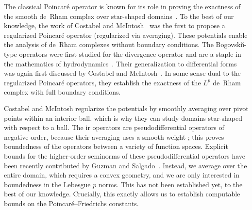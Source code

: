 \documentclass[10pt,letterpaper]{article}
\newcommand\cye[1]{%
  \protect\leavevmode
  \begingroup
    \color{red!35!yellow}%
    #1%
  \endgroup
}
\begin{document}


\begin{remark} \label{remark:reg_Poinc_Bog}
    The classical Poincar\'e operator is known for its role in proving the exactness of the smooth de~Rham complex over star-shaped domains~\cite{lee2012smooth}.
    To the best of our knowledge, the work of Costabel and McIntosh~\cite{costabel2010bogovskiui} was the first to propose a regularized Poincar\'e operator (regularized via averaging).
    These potentials enable the analysis of de~Rham complexes without boundary conditions.
    The Bogovski\u{\i}-type operators were first studied for the divergence operator and are a staple in the mathematics of hydrodynamics~\cite{bogovskii1979solution}.
    Their generalization to differential forms was \cye{again} first discussed by Costabel and McIntosh~\cite{costabel2010bogovskiui}. 
    In some sense dual to the regularized Poincar\'e operators, they establish the exactness of the $L^{p}$ de~Rham complex with full boundary conditions.

    Costabel and McIntosh regularize the potentials by smoothly averaging over pivot points within an interior ball, 
    which is why they \cye{can} study domains star-shaped with respect to a ball. 
    The\cye{ir} operators are pseudodifferential operators of negative order, 
    because their averaging uses a smooth weight\cye{; this} proves boundedness of the operators between a variety of function spaces. 
    Explicit bounds for the higher-order seminorms of these pseudodifferential operators 
    have been \cye{recently} contributed by Guzman and Salgado~\cite{guzman2021estimation}.
    Instead, we average over the entire domain, which requires a convex geometry, \cye{and we are only interested in boundedness in the Lebesgue $p$ norms.} This has not been established yet, to the best of our knowledge. \cye{Crucially, this exactly allows us to} establish \cye{computable bounds on the} Poincar\'e--Friedrichs constants. 
  
\end{remark}
\end{document}
